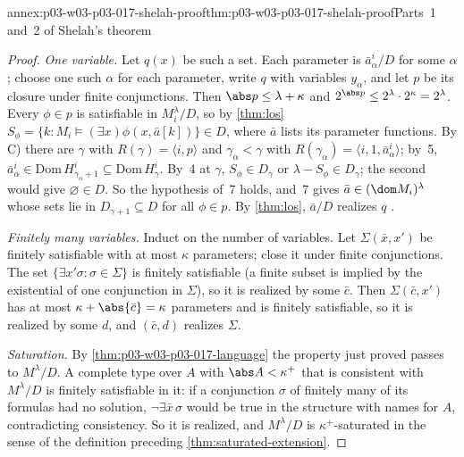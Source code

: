 \begin{annexitem}{annex:p03-w03-p03-017-shelah-proof}{thm:p03-w03-p03-017-shelah-proof}{Parts~1 and~2 of Shelah's theorem}
\begin{proof}
\emph{One variable.}  Let \(q(x)\) be such a set.  Each parameter is
\(\bar a^i_\alpha/D\) for some \(\alpha\); choose one such \(\alpha\) for each
parameter, write \(q\) with variables \(y_\alpha\), and let \(p\) be its
closure under finite conjunctions.  Then \(\abs p\le\lambda+\kappa\) and
\(2^{\abs p}\le2^\lambda\cdot2^\kappa=2^\lambda\).  Every \(\phi\in p\) is
satisfiable in \(M_i^\lambda/D\), so by \cref{thm:los}
\(S_\phi=\{k:M_i\models(\exists x)\phi(x,\bar a[k])\}\in D\), where
\(\bar a\) lists its parameter functions.  By C) there are \(\gamma\) with
\(R(\gamma)=\langle i,p\rangle\) and \(\gamma_\alpha<\gamma\) with
\(R(\gamma_\alpha)=\langle i,1,\bar a^i_\alpha\rangle\); by~5,
\(\bar a^i_\alpha\in\mathrm{Dom}\,H^i_{\gamma_\alpha+1}\subseteq
\mathrm{Dom}\,H^i_\gamma\).  By~4 at \(\gamma\), \(S_\phi\in D_\gamma\) or
\(\lambda-S_\phi\in D_\gamma\); the second would give
\(\varnothing\in D\).  So the hypothesis of~7 holds, and~7 gives
\(\bar a\in(\dom M_i)^\lambda\) whose sets lie in \(D_{\gamma+1}\subseteq D\)
for all \(\phi\in p\).  By \cref{thm:los}, \(\bar a/D\) realizes \(q\)
\cite[p.~231]{Shelah1971Ultrapowers}.

\emph{Finitely many variables.}  Induct on the number of variables.  Let
\(\Sigma(\bar x,x')\) be finitely satisfiable with at most \(\kappa\)
parameters; close it under finite conjunctions.  The set
\(\{\exists x'\sigma:\sigma\in\Sigma\}\) is finitely satisfiable (a finite
subset is implied by the existential of one conjunction in \(\Sigma\)), so it
is realized by some \(\bar c\).  Then \(\Sigma(\bar c,x')\) has at most
\(\kappa+\abs{\bar c}=\kappa\) parameters and is finitely satisfiable, so it
is realized by some \(d\), and \((\bar c,d)\) realizes \(\Sigma\).

\emph{Saturation.}  By \cref{thm:p03-w03-p03-017-language} the property just
proved passes to \(M^\lambda/D\).  A complete type over \(A\) with
\(\abs A<\kappa^+\) that is consistent with \(M^\lambda/D\) is finitely
satisfiable in it: if a conjunction \(\sigma\) of finitely many of its
formulas had no solution, \(\neg\exists\bar x\,\sigma\) would be true in the
structure with names for \(A\), contradicting consistency.  So it is
realized, and \(M^\lambda/D\) is \(\kappa^+\)-saturated in the sense of the
definition preceding \cref{thm:saturated-extension}.
\end{proof}
\end{annexitem}

